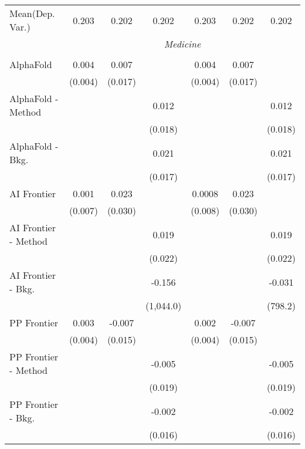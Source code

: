 \begin{tabular}{lcccccc}
Mean(Dep. Var.) & 0.203 & 0.202 & 0.202 & 0.203 & 0.202 & 0.202 \\
 & \multicolumn{6}{c}{\textit{Medicine}} \\ \\
   AlphaFold            & 0.004   & 0.007     &           & 0.004   & 0.007     &   \\   
                        & (0.004) & (0.017)   &           & (0.004) & (0.017)   &   \\   
   AlphaFold - Method   &         &           & 0.012     &         &           & 0.012\\   
                        &         &           & (0.018)   &         &           & (0.018)\\   
   AlphaFold - Bkg.     &         &           & 0.021     &         &           & 0.021\\   
                        &         &           & (0.017)   &         &           & (0.017)\\   
   AI Frontier          & 0.001   & 0.023     &           & 0.0008  & 0.023     &   \\   
                        & (0.007) & (0.030)   &           & (0.008) & (0.030)   &   \\   
   AI Frontier - Method &         &           & 0.019     &         &           & 0.019\\   
                        &         &           & (0.022)   &         &           & (0.022)\\   
   AI Frontier - Bkg.   &         &           & -0.156    &         &           & -0.031\\   
                        &         &           & (1,044.0) &         &           & (798.2)\\   
   PP Frontier          & 0.003   & -0.007    &           & 0.002   & -0.007    &   \\   
                        & (0.004) & (0.015)   &           & (0.004) & (0.015)   &   \\   
   PP Frontier - Method &         &           & -0.005    &         &           & -0.005\\   
                        &         &           & (0.019)   &         &           & (0.019)\\   
   PP Frontier - Bkg.   &         &           & -0.002    &         &           & -0.002\\   
                        &         &           & (0.016)   &         &           & (0.016)\\   

\end{tabular}
